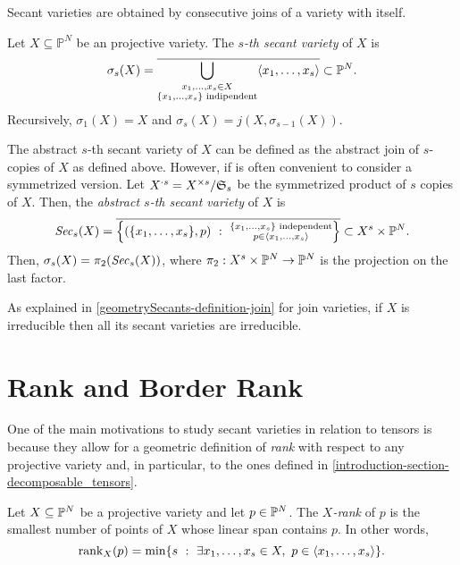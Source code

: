  Secant varieties are obtained by consecutive joins of a variety with itself.
 \begin{definition}
 \label{geometrySecants-definition-secantvariety}
 Let $X \subseteq \mathbb{P}^N$ be an projective variety. The {\it $s$-th secant variety} of $X$ is 
 \[
 \sigma_s(X) = \overline{\bigcup_{\substack{x_1,\ldots,x_s \in X \\ \{x_1,\ldots,x_s\} \text{ indipendent}}} \langle x_1,\ldots,x_s \rangle} \subset \mathbb{P}^N.
 \]
 Recursively, $\sigma_1(X) = X$ and $\sigma_s(X) = j(X,\sigma_{s-1}(X))$.
 
 The abstract $s$-th secant variety of $X$ can be defined as the abstract join of $s$-copies of $X$ as defined above. However, if is often convenient to consider a symmetrized version. Let $X^{\cdot s} = X^{\times s} / \mathfrak{S}_s$ be the symmetrized product of $s$ copies of $X$. Then, the {\it abstract $s$-th secant variety} of $X$ is 
 \[
     \mathit{Sec}_s(X) = \overline{\left\{(\{x_1,\ldots,x_s\},p) ~:~ \substack{\{x_1,\ldots,x_s\} \text{ independent} \\ p \in \langle x_1,\ldots,x_s \rangle}\right\}} \subset X^s \times \mathbb{P}^N.
 \]
 Then, $\sigma_s(X) = \pi_2(\mathit{Sec}_s(X))$, where $\pi_2 : X^s \times \mathbb{P}^N \rightarrow \mathbb{P}^N$ is the projection on the last factor.

 As explained in \ref{geometrySecants-definition-join} for join varieties, if $X$ is irreducible then all its secant varieties are irreducible.  
 \end{definition}
 
 \section{Rank and Border Rank}
 \label{geometrySecants-section-rank}
 
 One of the main motivations to study secant varieties in relation to tensors is because they allow for a geometric definition of {\it rank} with respect to any projective variety and, in particular, to the ones defined in \ref{introduction-section-decomposable_tensors}. 
 
 \begin{definition}
 \label{geometrySecants-definition-Xrank}
     Let $X \subseteq \mathbb{P}^N$ be a projective variety and let $p \in \mathbb{P}^N$. The \emph{$X$-rank} of $p$ is the smallest number of points of $X$ whose linear span contains $p$. In other words,
     \[
         \mathrm{rank}_X(p) = \min\{s ~:~ \exists x_1,\ldots,x_s \in X, ~ p \in \langle x_1,\ldots,x_s \rangle\}.
     \]
 \end{definition}
 
